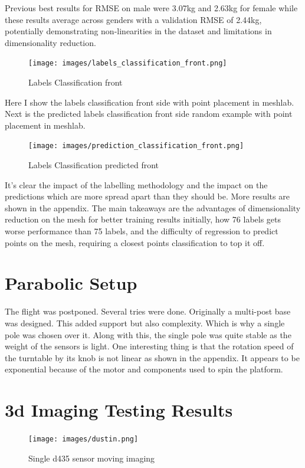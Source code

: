 Previous best results for RMSE on male were 3.07kg and 2.63kg for female while these results average across genders with a validation RMSE of 2.44kg, potentially demonstrating non-linearities in the dataset and limitations in dimensionality reduction.


\begin{figure}[!htb]
	\caption{Labels Classification front}
	\centering
	\texttt{[image: images/labels\_classification\_front.png]}
\end{figure}

Here I show the labels classification front side with point placement in meshlab. Next is the predicted labels classification front side random example with point placement in meshlab.

\begin{figure}[!htb]
	\caption{Labels Classification predicted front}
	\centering
	\texttt{[image: images/prediction\_classification\_front.png]}
\end{figure}

It's clear the impact of the labelling methodology and the impact on the predictions which are more spread apart than they should be. More results are shown in the appendix. The main takeaways are the advantages of dimensionality reduction on the mesh for better training results initially, how 76 labels gets worse performance than 75 labels, and the difficulty of regression to predict points on the mesh, requiring a closest points classification to top it off.

\section{Parabolic Setup}
The flight was postponed. Several tries were done. Originally a multi-post base was designed. This added support but also complexity. Which is why a single pole was chosen over it. Along with this, the single pole was quite stable as the weight of the sensors is light. One interesting thing is that the rotation speed of the turntable by its knob is not linear as shown in the appendix. It appears to be exponential because of the motor and components used to spin the platform.

\section{3d Imaging Testing Results}

\begin{figure}[!htb]
	\caption{Single d435 sensor moving imaging}
	\centering
	\texttt{[image: images/dustin.png]}
\end{figure}

